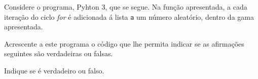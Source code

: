 \documentclass[12pt,varwidth=16cm,border=1pt]{standalone}
\begin{document}
Considere o programa, Pyhton 3, que se segue. Na função apresentada, a cada iteração do ciclo \textit{for} é adicionada á lista \verb+a+ um número aleatório, dentro da gama apresentada.



Acrescente a este programa o código que lhe permita indicar se as afirmações seguintes são verdadeiras ou falsas.

Indique se é verdadeiro ou falso.
\end{document}
